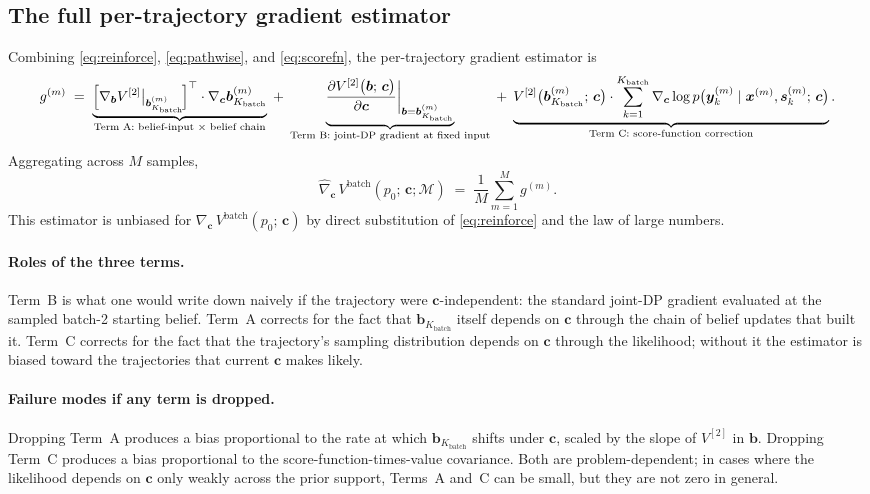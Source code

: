 \documentclass[11pt,a4paper]{article}
\newcommand{\bc}{\bm{c}}
\newcommand{\bx}{\bm{x}}
\newcommand{\by}{\bm{y}}
\newcommand{\bs}{\bm{s}}
\newcommand{\bb}{\bm{b}}
\begin{document}
\subsection{The full per-trajectory gradient estimator}
\label{sec:full_estimator}

Combining \eqref{eq:reinforce}, \eqref{eq:pathwise}, and \eqref{eq:scorefn}, the
per-trajectory gradient estimator is
\begin{equation}
g^{(m)}
\;=\;
\underbrace{\Bigl[\nabla_{\bb} V^{[2]}\bigr|_{\bb_{K_\mathrm{batch}}^{(m)}}\!\Bigr]^\top \cdot \nabla_{\bc} \bb_{K_\mathrm{batch}}^{(m)}}_{\text{Term A: belief-input × belief chain}}
\;+\;
\underbrace{\biggl.\frac{\partial V^{[2]}\bigl(\bb;\, \bc\bigr)}{\partial \bc}\biggr|_{\bb = \bb_{K_\mathrm{batch}}^{(m)}}}_{\text{Term B: joint-DP gradient at fixed input}}
\;+\;
\underbrace{V^{[2]}\bigl(\bb_{K_\mathrm{batch}}^{(m)};\, \bc\bigr) \cdot \sum_{k=1}^{K_\mathrm{batch}} \nabla_{\bc} \log p\bigl(\by_k^{(m)} \mid \bx^{(m)}, \bs_k^{(m)};\, \bc\bigr)}_{\text{Term C: score-function correction}}.
\label{eq:gm}
\end{equation}
Aggregating across $M$ samples,
\begin{equation}
\widehat{\nabla}_{\bc}\, V^\mathrm{batch}(p_0;\, \bc; \mathcal{M})
\;=\;
\frac{1}{M} \sum_{m=1}^{M} g^{(m)}.
\label{eq:full_estimator}
\end{equation}
This estimator is unbiased for $\nabla_{\bc}\, V^\mathrm{batch}(p_0;\, \bc)$ by direct
substitution of \eqref{eq:reinforce} and the law of large numbers.

\paragraph{Roles of the three terms.}  Term~B is what one would write down naively if the
trajectory were $\bc$-independent: the standard joint-DP gradient evaluated at the sampled
batch-2 starting belief.  Term~A corrects for the fact that $\bb_{K_\mathrm{batch}}$ itself
depends on $\bc$ through the chain of belief updates that built it.  Term~C corrects for
the fact that the trajectory's sampling distribution depends on $\bc$ through the
likelihood; without it the estimator is biased toward the trajectories that current $\bc$
makes likely.

\paragraph{Failure modes if any term is dropped.}  Dropping Term~A produces a bias
proportional to the rate at which $\bb_{K_\mathrm{batch}}$ shifts under $\bc$, scaled by
the slope of $V^{[2]}$ in $\bb$.  Dropping Term~C produces a bias proportional to the
score-function-times-value covariance.  Both are problem-dependent; in cases where the
likelihood depends on $\bc$ only weakly across the prior support, Terms~A and~C can be
small, but they are not zero in general.
\end{document}
